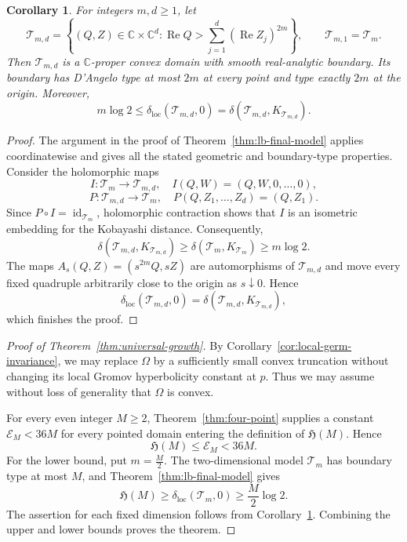 \documentclass[11pt]{article}
\newtheorem{corollary}[theorem]{Corollary}
\theoremstyle{definition}
\begin{document}
\begin{corollary}\label{cor:lb-final-higher-dimensional}
For integers $m,d\geq1$, let
\[
 \mathcal T_{m,d}
 =
 \left\{(Q,Z)\in\mathbb C\times\mathbb C^d:
 \operatorname{Re}Q>
 \sum_{j=1}^d(\operatorname{Re}Z_j)^{2m}\right\},
 \qquad \mathcal T_{m,1}=\mathcal T_m.
\]
Then $\mathcal T_{m,d}$ is a $\mathbb C$-proper convex domain with smooth
real-analytic boundary. Its boundary has D'Angelo type at most $2m$ at every
point and type exactly $2m$ at the origin. Moreover,
\[
 m\log2
 \leq\delta_{\mathrm{loc}}(\mathcal T_{m,d},0)
 =\delta(\mathcal T_{m,d},K_{\mathcal T_{m,d}}).
\]
\end{corollary}
\begin{proof}The argument in the proof of Theorem~\ref{thm:lb-final-model} applies
coordinatewise and gives all the stated geometric and boundary-type
properties.
Consider the holomorphic maps
\[
I:\mathcal T_m\longrightarrow\mathcal T_{m,d},\quad
 I(Q,W)=(Q,W,0,\ldots,0),\]
\[P:\mathcal T_{m,d}\longrightarrow\mathcal T_m,\quad
 P(Q,Z_1,\ldots,Z_d)=(Q,Z_1).
\]
Since $P\circ I=\operatorname{id}_{\mathcal T_m}$, holomorphic contraction
shows that $I$ is an isometric embedding for the Kobayashi distance.
Consequently,
\[
\delta(\mathcal T_{m,d},K_{\mathcal T_{m,d}})
\geq
\delta(\mathcal T_m,K_{\mathcal T_m})
\geq m\log 2.
\]
The maps $A_s(Q,Z)=(s^{2m}Q,sZ)$ are automorphisms of
$\mathcal T_{m,d}$ and move every fixed quadruple arbitrarily close to the
origin as $s\downarrow0$. Hence
\[
\delta_{\mathrm{loc}}(\mathcal T_{m,d},0)
=
\delta(\mathcal T_{m,d},K_{\mathcal T_{m,d}}),
\]
which finishes the proof.
\end{proof}

\begin{proof}[Proof of Theorem~\ref{thm:universal-growth}]
By Corollary~\ref{cor:local-germ-invariance}, we may replace $\Omega$ by
a sufficiently small convex truncation without changing its local Gromov
hyperbolicity constant at $p$. Thus we may assume without loss of
generality that $\Omega$ is convex.

For every even integer $M\geq2$, Theorem~\ref{thm:four-point} supplies a constant
$\mathcal E_M<36M$ for every pointed domain entering the definition of
$\mathfrak H(M)$. Hence
\[
 \mathfrak H(M)\leq \mathcal E_M<36M.
\]
For the lower bound, put $m=\frac{M}{2}$. The two-dimensional model
$\mathcal T_m$ has boundary type at most $M$, and
Theorem~\ref{thm:lb-final-model} gives
\[
 \mathfrak H(M)
 \geq\delta_{\mathrm{loc}}(\mathcal T_m,0)
 \geq\frac{M}{2}\log2.
\]
The assertion for each fixed dimension follows from
Corollary~\ref{cor:lb-final-higher-dimensional}. Combining the upper and
lower bounds proves the theorem.
\end{proof}
\end{document}
